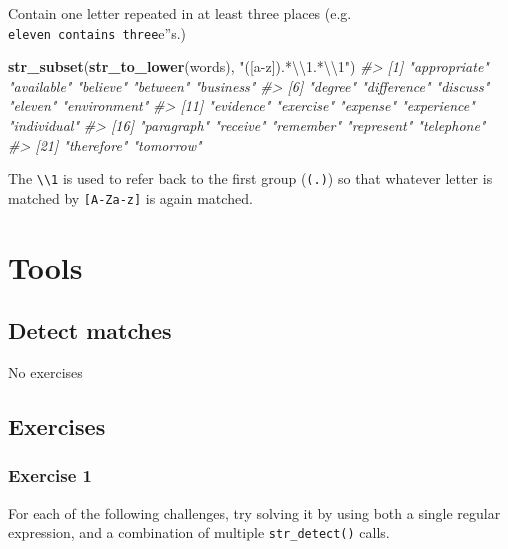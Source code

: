 \documentclass[]{book}
\newenvironment{Shaded}{\begin{snugshade}}{\end{snugshade}}
\newcommand{\CharTok}[1]{\textcolor[rgb]{0.31,0.60,0.02}{#1}}
\newcommand{\CommentTok}[1]{\textcolor[rgb]{0.56,0.35,0.01}{\textit{#1}}}
\newcommand{\KeywordTok}[1]{\textcolor[rgb]{0.13,0.29,0.53}{\textbf{#1}}}
\newcommand{\NormalTok}[1]{#1}
\newcommand{\StringTok}[1]{\textcolor[rgb]{0.31,0.60,0.02}{#1}}
\theoremstyle{definition}
\theoremstyle{definition}
\theoremstyle{definition}
\theoremstyle{remark}
\begin{document}
Contain one letter repeated in at least three places (e.g.
\texttt{eleven\textquotesingle{}\textquotesingle{}\ contains\ three}e''s.)

\begin{Shaded}
\begin{Highlighting}[]
\KeywordTok{str_subset}\NormalTok{(}\KeywordTok{str_to_lower}\NormalTok{(words), }\StringTok{"([a-z]).*}\CharTok{\textbackslash{}\textbackslash{}}\StringTok{1.*}\CharTok{\textbackslash{}\textbackslash{}}\StringTok{1"}\NormalTok{)}
\CommentTok{#>  [1] "appropriate" "available"   "believe"     "between"     "business"   }
\CommentTok{#>  [6] "degree"      "difference"  "discuss"     "eleven"      "environment"}
\CommentTok{#> [11] "evidence"    "exercise"    "expense"     "experience"  "individual" }
\CommentTok{#> [16] "paragraph"   "receive"     "remember"    "represent"   "telephone"  }
\CommentTok{#> [21] "therefore"   "tomorrow"}
\end{Highlighting}
\end{Shaded}

The \texttt{\textbackslash{}\textbackslash{}1} is used to refer back to
the first group (\texttt{(.)}) so that whatever letter is matched by
\texttt{{[}A-Za-z{]}} is again matched.

\hypertarget{tools}{%
\section{Tools}\label{tools}}

\hypertarget{detect-matches}{%
\subsection{Detect matches}\label{detect-matches}}

No exercises

\hypertarget{exercises-1}{%
\subsection{Exercises}\label{exercises-1}}

\hypertarget{exercise-1-31}{%
\subsubsection{Exercise 1}\label{exercise-1-31}}

For each of the following challenges, try solving it by using both a
single regular expression, and a combination of multiple
\texttt{str\_detect()} calls.
\end{document}
